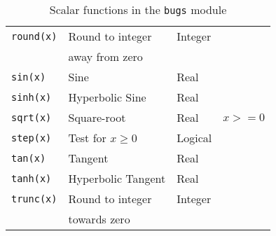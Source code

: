 \documentclass[11pt, a4paper, titlepage]{report}
\begin{document}
\begin{table}[h!]
\begin{center}
\begin{tabular}{llll}
\verb+round(x)+     & Round to integer    & Integer & \\
                    & away from zero      &      & \\
\verb+sin(x)+       & Sine                & Real & \\
\verb+sinh(x)+      & Hyperbolic Sine     & Real & \\
\verb+sqrt(x)+      & Square-root         & Real & $x >= 0$ \\
\verb+step(x)+      & Test for $x \geq 0$ & Logical & \\
\verb+tan(x)+       & Tangent             & Real & \\
\verb+tanh(x)+      & Hyperbolic Tangent  & Real & \\
\verb+trunc(x)+     & Round to integer    & Integer & \\
                    & towards zero        & \\
\hline
\end{tabular}
\caption{Scalar functions in the \texttt{bugs} module \label{table:bugs:scalar}}
\end{center}
\end{table}
\end{document}
